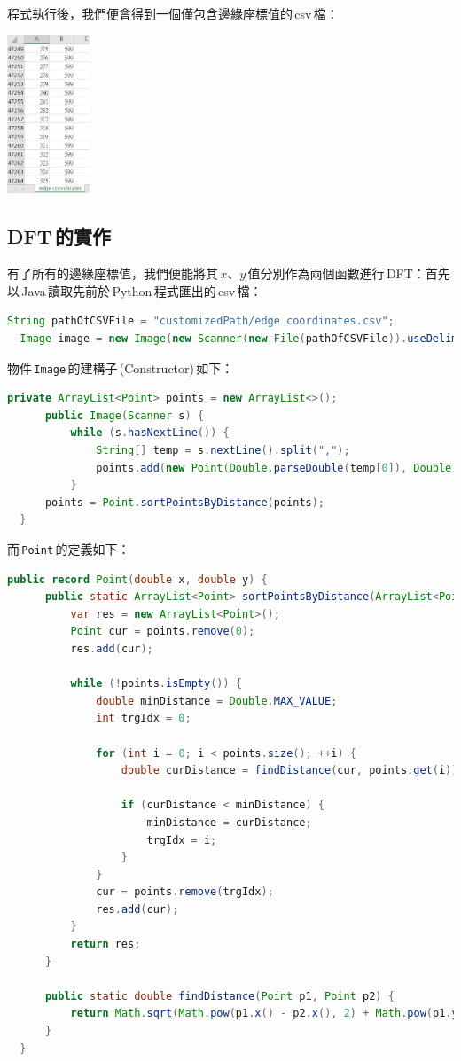   程式執行後，我們便會得到一個僅包含邊緣座標值的\,csv\,檔：
  \begin{center}
    \includegraphics[width=70pt]{detected edge csv.jpg}
  \end{center}

  \subsection{DFT\,的實作}
  有了所有的邊緣座標值，我們便能將其\,\(x\)、\(y\)\,值分別作為兩個函數進行\,DFT：首先以\,Java\,讀取先前於\,Python\,程式匯出的\,csv\,檔：
  \begin{lstlisting}[language=Java]
  String pathOfCSVFile = "customizedPath/edge coordinates.csv";
  Image image = new Image(new Scanner(new File(pathOfCSVFile)).useDelimiter(","));
  \end{lstlisting}
  \noindent 物件\,\texttt{Image}\,的建構子\,(Constructor)\,如下：
  \begin{lstlisting}[language=Java]
  private ArrayList<Point> points = new ArrayList<>();
      public Image(Scanner s) {
          while (s.hasNextLine()) {
              String[] temp = s.nextLine().split(",");
              points.add(new Point(Double.parseDouble(temp[0]), Double.parseDouble(temp[1])));
          }
      points = Point.sortPointsByDistance(points);
  }
  \end{lstlisting}
  \noindent 而\,\texttt{Point}\,的定義如下：
  \begin{lstlisting}[language=Java]
  public record Point(double x, double y) {
      public static ArrayList<Point> sortPointsByDistance(ArrayList<Point> points) {
          var res = new ArrayList<Point>();
          Point cur = points.remove(0);
          res.add(cur);

          while (!points.isEmpty()) {
              double minDistance = Double.MAX_VALUE;
              int trgIdx = 0;

              for (int i = 0; i < points.size(); ++i) {
                  double curDistance = findDistance(cur, points.get(i));

                  if (curDistance < minDistance) {
                      minDistance = curDistance;
                      trgIdx = i;
                  }
              }
              cur = points.remove(trgIdx);
              res.add(cur);
          }
          return res;
      }

      public static double findDistance(Point p1, Point p2) {
          return Math.sqrt(Math.pow(p1.x() - p2.x(), 2) + Math.pow(p1.y() - p2.y(), 2));
      }
  }
  \end{lstlisting}
